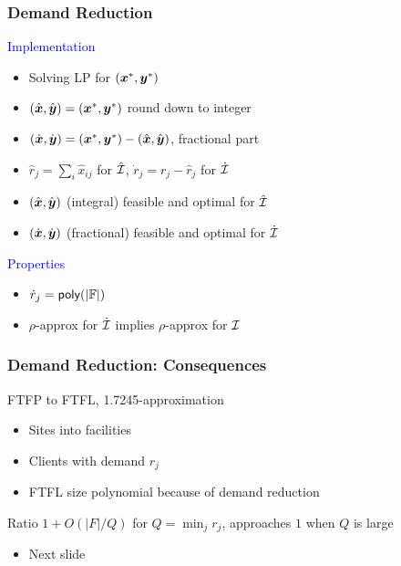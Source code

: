 \documentclass[hyperref,dvipsnames,svgnames,compress]{beamer}
\begin{document}
\begin{frame}
  \frametitle{Demand Reduction}

  \large{\textcolor{blue}{Implementation}}

  \begin{itemize}
  \item Solving LP for $(\boldsymbol{x}^\ast, \boldsymbol{y}^\ast)$
  \item $(\hat{\boldsymbol{x}}, \hat{\boldsymbol{y}}) = (\boldsymbol{x}^\ast, \boldsymbol{y}^\ast)$ round down to integer
  \item $(\dot{\boldsymbol{x}}, \dot{\boldsymbol{y}}) = (\boldsymbol{x}^\ast, \boldsymbol{y}^\ast) - (\hat{\boldsymbol{x}}, \hat{\boldsymbol{y}})$, fractional part
  \item $\hat r_j = \sum_{i}\hat x_{ij}$ for $\hat{\mathcal{I}}$, $\dot r_j = r_j - \hat r_j$ for $\dot{\mathcal{I}}$
  \item $(\hat{\boldsymbol{x}}, \hat{\boldsymbol{y}})$ (integral) feasible and optimal for $\hat{\mathcal{I}}$
  \item $(\dot{\boldsymbol{x}}, \dot{\boldsymbol{y}})$ (fractional) feasible and optimal for $\dot{\mathcal{I}}$
  \end{itemize}
  
  \large{\textcolor{blue}{Properties}}

  \begin{itemize}
  \item ${\dot r}_j = {\mbox{\sf poly}}(|\mathbb{F}|)$
  \item $\rho$-approx for $\dot {\mathcal{I}}$ implies $\rho$-approx for $\mathcal{I}$
  \end{itemize}
\end{frame}

\begin{frame}
  \frametitle{Demand Reduction: Consequences}
  \begin{block}{}
    FTFP to FTFL, 1.7245-approximation    
  \end{block}
  \begin{itemize}
  \item Sites into facilities
  \item Clients with demand $r_j$
  \item FTFL size polynomial because of demand reduction
  \end{itemize}

  \begin{block}{}
    Ratio $1 + O(|F| / Q)$ for $Q = \min_j r_j$,
    approaches $1$ when $Q$ is large
  \end{block}
  \begin{itemize}
  \item Next slide
  \end{itemize}
\end{frame}
\end{document}
